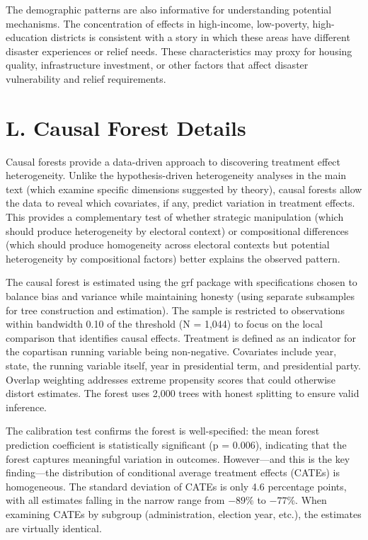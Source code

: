 \documentclass[12pt,letterpaper,oneside]{book}
\begin{document}
The demographic patterns are also informative for understanding potential mechanisms. The concentration of effects in high-income, low-poverty, high-education districts is consistent with a story in which these areas have different disaster experiences or relief needs. These characteristics may proxy for housing quality, infrastructure investment, or other factors that affect disaster vulnerability and relief requirements.


\section*{L. Causal Forest Details}

Causal forests \citep{wager2018estimation, athey2016recursive} provide a data-driven approach to discovering treatment effect heterogeneity. Unlike the hypothesis-driven heterogeneity analyses in the main text (which examine specific dimensions suggested by theory), causal forests allow the data to reveal which covariates, if any, predict variation in treatment effects. This provides a complementary test of whether strategic manipulation (which should produce heterogeneity by electoral context) or compositional differences (which should produce homogeneity across electoral contexts but potential heterogeneity by compositional factors) better explains the observed pattern.

The causal forest is estimated using the grf package with specifications chosen to balance bias and variance while maintaining honesty (using separate subsamples for tree construction and estimation). The sample is restricted to observations within bandwidth 0.10 of the threshold (N = 1,044) to focus on the local comparison that identifies causal effects. Treatment is defined as an indicator for the copartisan running variable being non-negative. Covariates include year, state, the running variable itself, year in presidential term, and presidential party. Overlap weighting addresses extreme propensity scores that could otherwise distort estimates. The forest uses 2,000 trees with honest splitting to ensure valid inference.

The calibration test confirms the forest is well-specified: the mean forest prediction coefficient is statistically significant (p = 0.006), indicating that the forest captures meaningful variation in outcomes. However---and this is the key finding---the distribution of conditional average treatment effects (CATEs) is homogeneous. The standard deviation of CATEs is only 4.6 percentage points, with all estimates falling in the narrow range from $-89\%$ to $-77\%$. When examining CATEs by subgroup (administration, election year, etc.), the estimates are virtually identical.
\end{document}
